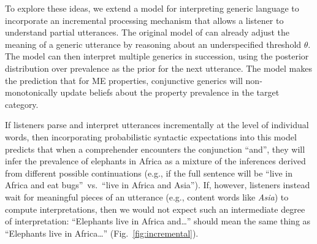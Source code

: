 \documentclass[letterpaper, 12pt]{article}
\begin{document}
To explore these ideas, we extend a model for interpreting generic language to incorporate an incremental processing mechanism that allows a listener to understand partial utterances.
The original model of  can already adjust the meaning of a generic utterance by reasoning about an underspecified threshold $\theta$.
The model can then interpret multiple generics in succession, using the posterior distribution over prevalence as the prior for the next utterance. 
The model makes the prediction that for ME properties, conjunctive generics will non-monotonically update beliefs about the property prevalence in the target category. 

If listeners parse and interpret utterances incrementally at the level of individual words, then incorporating probabilistic syntactic expectations \cite{Levy2008} into this model predicts that when a comprehender encounters the conjunction ``and'', they will infer the prevalence of elephants in Africa as a mixture of the inferences derived from different possible continuations (e.g., if the full sentence will be ``live in Africa and eat bugs''~vs.~``live in Africa and Asia'').
If, however, listeners instead wait for meaningful pieces of an utterance (e.g., content words like \emph{Asia}) to compute interpretations, then we would not expect such an intermediate degree of interpretation: ``Elephants live in Africa and\ldots'' should mean the same thing as ``Elephants live in Africa\ldots'' (Fig.~\ref{fig:incremental}). 

\end{document}
